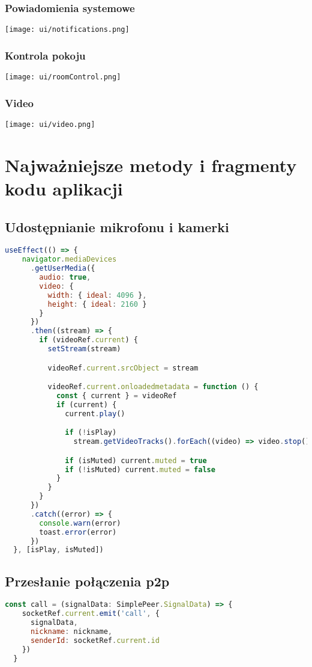 \documentclass{article}
\begin{document}
\subsubsection{Powiadomienia systemowe}
\texttt{[image: ui/notifications.png]}

\subsubsection{Kontrola pokoju}
\texttt{[image: ui/roomControl.png]}

\subsubsection{Video}
\texttt{[image: ui/video.png]}

\section{Najważniejsze metody i fragmenty kodu aplikacji}

\subsection{Udostępnianie mikrofonu i kamerki}
\begin{lstlisting}[language=JavaScript]
  useEffect(() => {
    navigator.mediaDevices
      .getUserMedia({
        audio: true,
        video: {
          width: { ideal: 4096 },
          height: { ideal: 2160 }
        }
      })
      .then((stream) => {
        if (videoRef.current) {
          setStream(stream)

          videoRef.current.srcObject = stream

          videoRef.current.onloadedmetadata = function () {
            const { current } = videoRef
            if (current) {
              current.play()

              if (!isPlay)
                stream.getVideoTracks().forEach((video) => video.stop())

              if (isMuted) current.muted = true
              if (!isMuted) current.muted = false
            }
          }
        }
      })
      .catch((error) => {
        console.warn(error)
        toast.error(error)
      })
  }, [isPlay, isMuted])
\end{lstlisting}

\subsection{Przesłanie połączenia p2p}
\begin{lstlisting}[language=JavaScript]
  const call = (signalData: SimplePeer.SignalData) => {
    socketRef.current.emit('call', {
      signalData,
      nickname: nickname,
      senderId: socketRef.current.id
    })
  }
\end{lstlisting}
\end{document}
